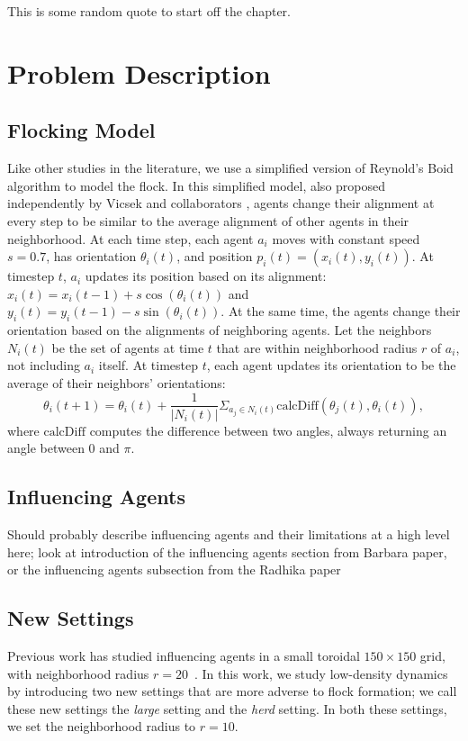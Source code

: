 \begin{savequote}[75mm]
This is some random quote to start off the chapter.
\end{savequote}

\chapter{Problem Description}
\label{ch:problem}

\section{Flocking Model}
Like other studies in the literature, we use a simplified version of Reynold's
Boid algorithm \cite{reynoldsmodel} to model the flock.
In this simplified model, also proposed independently by Vicsek and
collaborators \cite{vicsek1995},
agents change their alignment at every step to be similar to the average
alignment of other agents in their neighborhood.
At each time step, each agent $a_i$ moves with constant speed $s=0.7$, has
orientation $\theta_i(t)$, and position $p_i(t) = (x_i(t), y_i(t))$.
At timestep $t$, $a_i$ updates its position based on its alignment:
$x_i(t) = x_i(t-1) + s\cos(\theta_i(t))$ and
$y_i(t) = y_i (t-1) - s\sin(\theta_i(t))$.
At the same time, the agents change their orientation based on the alignments
of neighboring agents.
Let the neighbors $N_i(t)$ be the set of agents at time $t$ that are within
neighborhood radius $r$ of $a_i$, not including $a_i$ itself.
At timestep $t$, each agent updates its orientation to be the average of their
neighbors' orientations:
\[\theta_i(t+1)=\theta_i(t)+\frac{1}{|N_i(t)|} \Sigma_{a_j \in N_i(t)}
\text{calcDiff}(\theta_j(t),\theta_i(t)),\]
where $\text{calcDiff}$ computes the difference between two angles, always
returning an angle between $0$ and $\pi$.

\section{Influencing Agents}
Should probably describe influencing agents and their limitations at a high
level here; look at introduction of the influencing agents section from Barbara
paper, or the influencing agents subsection from the Radhika paper

\section{New Settings}
Previous work has studied influencing agents in a small toroidal $150\times150$
grid, with neighborhood radius $r=20$~\cite{genter2016facegoalfacecurrent,
genter201612steplookahead}.
In this work, we study low-density dynamics by introducing two new settings
that are more adverse to flock formation; we call these new settings the
\textit{large} setting and the \textit{herd} setting.
In both these settings, we set the neighborhood radius to $r=10$.

